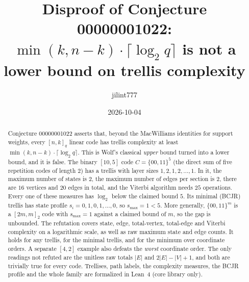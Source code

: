 \documentclass[11pt]{article}
\title{Disproof of Conjecture 00000001022:\\
$\min(k,n-k)\cdot\lceil\log_2 q\rceil$ is not a lower bound on trellis complexity}
\author{jilint777}
\date{2026-10-04}
\theoremstyle{definition}
\theoremstyle{remark}
\newcommand{\smax}{s_{\max}}
\begin{document}
\sloppy
\maketitle

\begin{abstract}
Conjecture 00000001022 asserts that, beyond the MacWilliams identities for support
weights, every $[n,k]_q$ linear code has trellis complexity at least
$\min(k,n-k)\cdot\lceil\log_2 q\rceil$. This is Wolf's classical \emph{upper} bound
turned into a lower bound, and it is false. The binary $[10,5]$ code
$C=\{00,11\}^5$ (the direct sum of five repetition codes of length $2$) has a
trellis with layer sizes $1,2,1,2,\dots,1$. In it, the maximum number of states is $2$, the
maximum number of edges per section is $2$, there are $16$ vertices and $20$
edges in total, and the Viterbi algorithm needs $25$ operations. Every one of
these measures has $\log_2$ below the claimed bound $5$. Its minimal (BCJR)
trellis has state profile $s_i=0,1,0,1,\dots,0$, so $\smax=1<5$. More generally,
$\{00,11\}^m$ is a $[2m,m]_2$ code with $\smax=1$ against a claimed bound of $m$,
so the gap is unbounded. The refutation covers state, edge, total-vertex,
total-edge and Viterbi complexity on a logarithmic scale, as well as raw maximum
state and edge counts. It holds for any trellis, for the minimal trellis, and for the
minimum over coordinate orders. A separate $[4,2]$ example also defeats the
\emph{worst} coordinate order. The only readings not refuted are the unitless raw totals $|E|$ and
$2|E|-|V|+1$, and both are trivially true for every code. Trellises, path labels, the complexity measures,
the BCJR profile and the whole family are formalized in Lean~4 (core library only).
\end{abstract}
\end{document}
